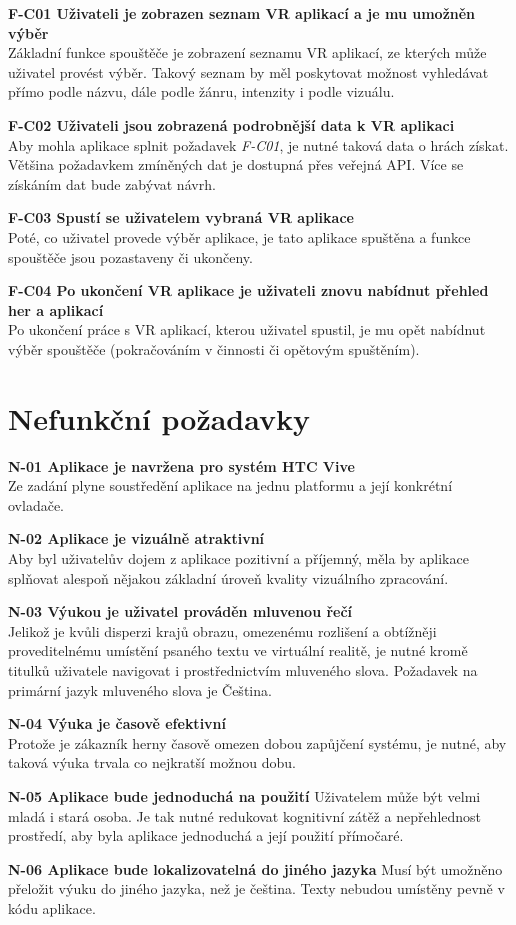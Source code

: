 \textbf{F-C01 Uživateli je zobrazen seznam VR aplikací a je mu umožněn
výběr}\\
Základní funkce spouštěče je zobrazení seznamu VR aplikací, ze kterých
může uživatel provést výběr. Takový seznam by měl poskytovat možnost
vyhledávat přímo podle názvu, dále podle žánru, intenzity i podle
vizuálu.

\textbf{F-C02 Uživateli jsou zobrazená podrobnější data k VR aplikaci}\\
Aby mohla aplikace splnit požadavek \emph{F-C01}, je nutné taková data o
hrách získat. Většina požadavkem zmíněných dat je dostupná přes veřejná
API. Více se získáním dat bude zabývat návrh.

\textbf{F-C03 Spustí se uživatelem vybraná VR aplikace}\\
Poté, co uživatel provede výběr aplikace, je tato aplikace spuštěna a
funkce spouštěče jsou pozastaveny či ukončeny.

\textbf{F-C04 Po ukončení VR aplikace je uživateli znovu nabídnut
přehled her a aplikací}\\
Po ukončení práce s VR aplikací, kterou uživatel spustil, je mu opět
nabídnut výběr spouštěče (pokračováním v činnosti či opětovým
spuštěním).

\section{Nefunkční požadavky}\label{nefunkux10dnuxed-poux17eadavky}

\textbf{N-01 Aplikace je navržena pro systém HTC Vive}\\
Ze zadání plyne soustředění aplikace na jednu platformu a její konkrétní
ovladače.

\textbf{N-02 Aplikace je vizuálně atraktivní}\\
Aby byl uživatelův dojem z aplikace pozitivní a příjemný, měla by
aplikace splňovat alespoň nějakou základní úroveň kvality vizuálního
zpracování.

\textbf{N-03 Výukou je uživatel prováděn mluvenou řečí}\\
Jelikož je kvůli disperzi krajů obrazu, omezenému rozlišení a obtížněji
proveditelnému umístění psaného textu ve virtuální realitě, je nutné
kromě titulků uživatele navigovat i prostřednictvím mluveného slova.
Požadavek na primární jazyk mluveného slova je Čeština.

\textbf{N-04 Výuka je časově efektivní}\\
Protože je zákazník herny časově omezen dobou zapůjčení systému, je
nutné, aby taková výuka trvala co nejkratší možnou dobu.

\textbf{N-05 Aplikace bude jednoduchá na použití} Uživatelem může být
velmi mladá i stará osoba. Je tak nutné redukovat kognitivní zátěž a
nepřehlednost prostředí, aby byla aplikace jednoduchá a její použití
přímočaré.

\textbf{N-06 Aplikace bude lokalizovatelná do jiného jazyka} Musí být
umožněno přeložit výuku do jiného jazyka, než je čeština. Texty nebudou
umístěny pevně v kódu aplikace.

